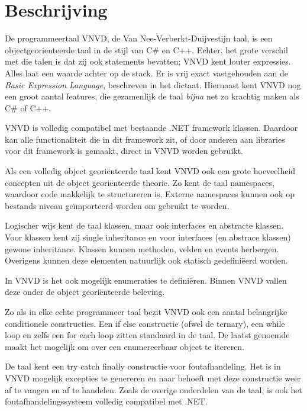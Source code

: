 \section{Beschrijving}
De programmeertaal VNVD, de Van Nee-Verberkt-Duijvestijn taal, is een objectgeorienteerde taal in de stijl van C\# en C++. Echter, het grote verschil met die talen is dat zij ook statements bevatten; VNVD kent louter expressies. Alles laat een waarde achter op de stack. Er is vrij exact vastgehouden aan de \emph{Basic Expression Language}, beschreven in het dictaat. Hiernaast kent VNVD nog een groot aantal features, die gezamenlijk de taal \textit{bijna} net zo krachtig maken als C\# of C++.

VNVD is volledig compatibel met bestaande .NET framework klassen. Daardoor kan alle functionaliteit die in dit framework zit, of door anderen aan libraries voor dit framework is gemaakt, direct in VNVD worden gebruikt. %

Als een volledig object geori\"enteerde taal kent VNVD ook een grote hoeveelheid concepten uit de object geori\"enteerde theorie. Zo kent de taal namespaces, waardoor code makkelijk te structureren is. Externe namespaces kunnen ook op bestands niveau ge\"importeerd worden om gebruikt te worden.

Logischer wijs kent de taal klassen, maar ook interfaces en abstracte klassen. Voor klassen kent zij single inheritance en voor interfaces (en abstrace klassen) gewone inheritance. Klassen kunnen methoden, velden en events herbergen. Overigens kunnen deze elementen natuurlijk ook statisch gedefini\"eerd worden.

In VNVD is het ook mogelijk enumeraties te defini\"eren. Binnen VNVD vallen deze onder de object geori\"enteerde beleving.

Zo als in elke echte programmeer taal bezit VNVD ook een aantal belangrijke conditionele constructies. Een if else constructie (ofwel de ternary), een while loop en zelfs een for each loop zitten standaard in de taal. De laatst genoemde maakt het mogelijk om over een enumereerbaar object te itereren. %

De taal kent een try catch finally constructie voor foutafhandeling. Het is in VNVD mogelijk excepties te genereren en naar behoeft met deze constructie weer af te vangen en af te handelen. Zoals de overige onderdelen van de taal, is ook het foutafhandelingssysteem volledig compatibel met .NET.

